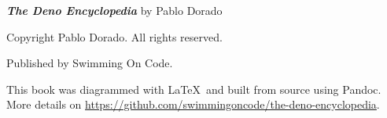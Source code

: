 \thispagestyle{empty}
{\small 

\textbf{\textit{The Deno Encyclopedia}} \newline
by Pablo Dorado \vspace{1em}

Copyright  Pablo Dorado. All rights reserved. \vspace{2em}

Published by Swimming On Code.

}

\vspace{4.4in}

{\footnotesize
This book was diagrammed with \LaTeX~and built from source using Pandoc. \\
More details on \href{https://github.com/swimmingoncode/the-deno-encyclopedia}{https://github.com/swimmingoncode/the-deno-encyclopedia}.
}

\newpage